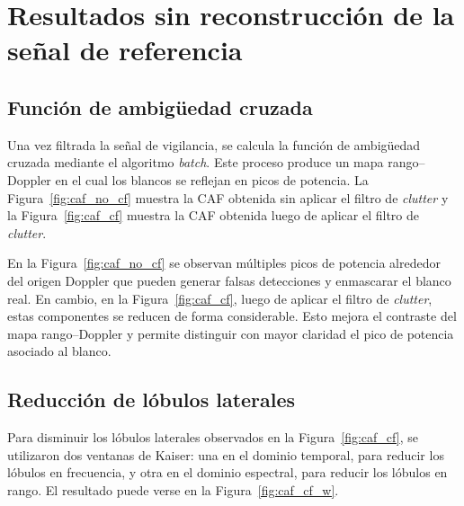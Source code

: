 \section{Resultados sin reconstrucción de la señal de referencia}



\subsection{Función de ambigüedad cruzada}



Una vez filtrada la señal de vigilancia, se calcula la función de ambigüedad cruzada mediante el algoritmo \textit{batch}. Este proceso produce un mapa rango--Doppler en el cual los blancos se reflejan en picos de potencia. La Figura~\ref{fig:caf_no_cf} muestra la CAF obtenida sin aplicar el filtro de \textit{clutter} y la Figura~\ref{fig:caf_cf} muestra la CAF obtenida luego de aplicar el filtro de \textit{clutter}.













En la Figura~\ref{fig:caf_no_cf} se observan múltiples picos de potencia alrededor del origen Doppler que pueden generar falsas detecciones y enmascarar el blanco real. En cambio, en la Figura~\ref{fig:caf_cf}, luego de aplicar el filtro de \textit{clutter}, estas componentes se reducen de forma considerable. Esto mejora el contraste del mapa rango--Doppler y permite distinguir con mayor claridad el pico de potencia asociado al blanco.



\subsection{Reducción de lóbulos laterales}



Para disminuir los lóbulos laterales observados en la Figura~\ref{fig:caf_cf}, se utilizaron dos ventanas de Kaiser: una en el dominio temporal, para reducir los lóbulos en frecuencia, y otra en el dominio espectral, para reducir los lóbulos en rango. El resultado puede verse en la Figura~\ref{fig:caf_cf_w}.


